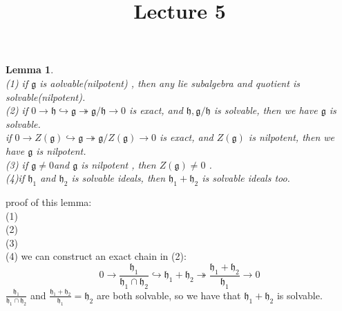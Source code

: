 \documentclass[UTF8]{ctexart}
\title{Lecture 5}
\date{}
\newtheorem{lemma}{Lemma}[section]
\begin{document}
\maketitle
\begin{lemma}
    $ \ $
    \\(1) if $ \mathfrak{g} $ is aolvable(nilpotent) , then any lie subalgebra and quotient is solvable(nilpotent).
    \\(2) if $0 \rightarrow  \mathfrak{h} \hookrightarrow \mathfrak{g} \twoheadrightarrow \mathfrak{g}/\mathfrak{h} \to 0$
    is exact, and $\mathfrak{h}, \mathfrak{g}/\mathfrak{h}$ is solvable, then we have $\mathfrak{g}$ is solvable. 
    \\ if $0 \rightarrow  Z(\mathfrak{g}) \hookrightarrow \mathfrak{g} \twoheadrightarrow \mathfrak{g}/ Z(\mathfrak{g}) \to 0$
    is exact, and $ Z(\mathfrak{g})$ is nilpotent, then we have $\mathfrak{g}$ is nilpotent.
    \\(3) if $\mathfrak{g} \neq 0 $and $\mathfrak{g}$ is nilpotent , then $Z(\mathfrak{g}) \neq 0$ .
    \\(4)if $\mathfrak{h_1}$ and $\mathfrak{h_2}$ is solvable ideals, then $\mathfrak{h_1}+\mathfrak{h_2}$ is solvable ideals too.
\end{lemma}
 $\ $ \\proof of this lemma: \\(1)
 \\(2)
 \\(3)
\\(4) we can construct an exact chain in (2): 
$$  0 \rightarrow  \frac {\mathfrak{h_1}} {\mathfrak{h_1}\cap\mathfrak{h_2}}  \hookrightarrow \mathfrak{h_1}+\mathfrak{h_2} \twoheadrightarrow  \frac{\mathfrak{h_1}+\mathfrak{h_2} }{\mathfrak{h_1}}  \to 0  $$
$\frac {\mathfrak{h_1}} {\mathfrak{h_1}\cap\mathfrak{h_2}} $ and  $\frac{\mathfrak{h_1}+\mathfrak{h_2} }{\mathfrak{h_1}}=\mathfrak{h_2}$ are both solvable,
so we have that $\mathfrak{h_1}+\mathfrak{h_2} $ is solvable. 
\end{document}
